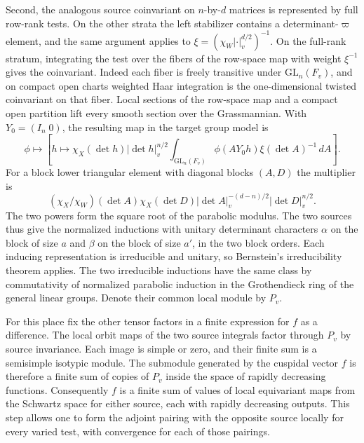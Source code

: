 Second, the analogous source coinvariant on \(n\)-by-\(d\) matrices
is represented by full row-rank tests. On the other strata the left
stabilizer contains a determinant-\(\varpi\) element, and the same
argument applies to \(\xi=(\chi_W|\cdot|_v^{d/2})^{-1}\).
On the full-rank stratum, integrating the test over the fibers of
the row-space map with weight \(\xi^{-1}\) gives the coinvariant.
Indeed each fiber is freely transitive under \(\mathrm{GL}_n(F_v)\),
and on compact open charts weighted Haar integration is the
one-dimensional twisted coinvariant on that fiber. Local sections
of the row-space map and a compact open partition lift every smooth
section over the Grassmannian. With \(Y_0=(I_n\;0)\), the resulting
map in the target group model is
\[
  \phi\longmapsto
  \left[h\longmapsto \chi_X(\det h)|\det h|_v^{n/2}
        \int_{\mathrm{GL}_n(F_v)}
         \phi(A Y_0 h)\xi(\det A)^{-1}\,dA\right].
\]
For a block lower triangular element with diagonal blocks \((A,D)\)
the multiplier is
\[
 (\chi_X/\chi_W)(\det A)\chi_X(\det D)
 |\det A|_v^{-(d-n)/2}|\det D|_v^{n/2}.
\]
The two powers form the square root of the parabolic modulus. The
two sources thus give the normalized inductions with unitary
determinant characters \(\alpha\) on the block of size \(a\) and
\(\beta\) on the block of size \(a'\), in the two block orders.
Each inducing representation is irreducible and unitary, so
Bernstein's irreducibility theorem applies. The two irreducible
inductions have the same class by commutativity of normalized
parabolic induction in the Grothendieck ring of the general linear
groups. Denote their common local module by \(P_v\).
\cite[\S8.2, Corollary (a)]{p2bernstein-unitary-induction}
\cite[Theorem~1.9]{p2zelevinsky-induction-ring}

For this place fix the other tensor factors in a finite expression
for \(f\) as a difference. The local orbit maps of the two source
integrals factor through \(P_v\) by source invariance. Each image
is simple or zero, and their finite sum is a semisimple isotypic
module. The submodule generated by the cuspidal vector \(f\) is
therefore a finite sum of copies of \(P_v\) inside the space of
rapidly decreasing functions. Consequently \(f\) is a finite sum
of values of local equivariant maps from the Schwartz space for
either source, each with rapidly decreasing outputs. This step
allows one to form the adjoint pairing with the opposite source
locally for every varied test, with convergence for each of those
pairings.

